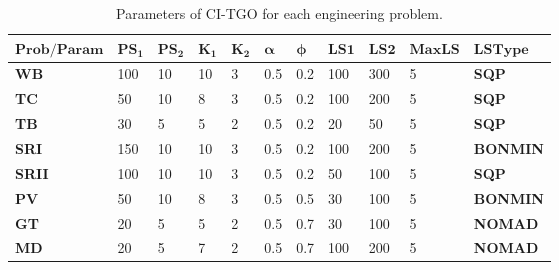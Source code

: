 
\begin{table*}[tp]
    \tiny
\begin{center}
\begin{tabular}{ | P{0.8cm} | P{0.8cm} | P{0.8cm} | P{0.8cm} | P{0.8cm} | P{0.8cm} | P{0.8cm} | P{0.8cm} | P{0.8cm} | P{0.9cm} | P{0.9cm}  | }
\hline
$\bm{Prob / \allowbreak Param}$ & $\bm{PS_1}$ & $\bm{PS_2}$ & $\bm{K_1}$ & $\bm{K_2}$ & $\bm{\alpha}$ & $\bm{\phi}$ & $\bm{LS1}$ & $\bm{LS2}$ & $\bm{MaxLS}$ & $\bm{LSType}$ \\
\hline

\textbf{WB} & 100 & 10 & 10 & 3 & 0.5 & 0.2 & 100 & 300 & 5 & \textbf{SQP} \\
\textbf{TC} & 50 & 10 & 8 & 3 & 0.5 & 0.2 & 100 & 200 & 5 & \textbf{SQP} \\
\textbf{TB} & 30 & 5 & 5 & 2 & 0.5 & 0.2 & 20 & 50 & 5 & \textbf{SQP} \\
\textbf{SRI} & 150 & 10 & 10 & 3 & 0.5 & 0.2 & 100 & 200 & 5 & \textbf{BONMIN} \\
\textbf{SRII} & 100 & 10 & 10 & 3 & 0.5 & 0.2 & 50 & 100 & 5 & \textbf{SQP} \\
\textbf{PV} & 50 & 10 & 8 & 3 & 0.5 & 0.5 & 30 & 100 & 5 & \textbf{BONMIN} \\
\textbf{GT} & 20 & 5 & 5 & 2 & 0.5 & 0.7 & 30 & 100 & 5 & \textbf{NOMAD} \\
\textbf{MD} & 20 & 5 & 7 & 2 & 0.5 & 0.7 & 100 & 200 & 5 & \textbf{NOMAD} \\
\hline

\end{tabular}
\end{center}
\vspace*{-6mm}
\caption{ Parameters of CI-TGO for each engineering problem. \\[1em]}
\label{tab:Parameters}
\end{table*}

